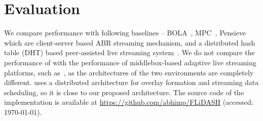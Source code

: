 \section{Evaluation}
\label{sec:chap06:evaluations}
We compare {\our} performance with following baselines -- BOLA~\cite{Spiteri2016}, MPC~\cite{yin2015control}, Pensieve~\cite{mao2017neural} which are client-server based \ac{ABR} streaming mechanism, and a distributed hash table (DHT) based peer-assisted live streaming system~\cite{shen2013dht}. 
We do not compare the performance of {\our} with the performance of middlebox-based adaptive live streaming platforms, such as~\cite{detti2016tracker,payberah2012clive,wang2014migration,khalid2019sdn}, as the architectures of the two environments are completely different. \cite{shen2013dht} uses a distributed architecture for overlay formation and streaming data scheduling, so it is close to our proposed architecture. 
The source code of the implementation is available at \url{https://github.com/abhimp/FLiDASH} (accessed: \today).

